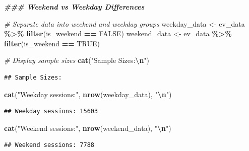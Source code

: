 \documentclass[
  12pt,
]{article}
\newenvironment{Shaded}{\begin{snugshade}}{\end{snugshade}}
\newcommand{\CommentTok}[1]{\textcolor[rgb]{0.56,0.35,0.01}{\textit{#1}}}
\newcommand{\ConstantTok}[1]{\textcolor[rgb]{0.56,0.35,0.01}{#1}}
\newcommand{\DocumentationTok}[1]{\textcolor[rgb]{0.56,0.35,0.01}{\textbf{\textit{#1}}}}
\newcommand{\FunctionTok}[1]{\textcolor[rgb]{0.13,0.29,0.53}{\textbf{#1}}}
\newcommand{\NormalTok}[1]{#1}
\newcommand{\OtherTok}[1]{\textcolor[rgb]{0.56,0.35,0.01}{#1}}
\newcommand{\SpecialCharTok}[1]{\textcolor[rgb]{0.81,0.36,0.00}{\textbf{#1}}}
\newcommand{\StringTok}[1]{\textcolor[rgb]{0.31,0.60,0.02}{#1}}
\begin{document}
\begin{Shaded}
\begin{Highlighting}[]
\DocumentationTok{\#\#\# Weekend vs Weekday Differences}

\CommentTok{\# Separate data into weekend and weekday groups}
\NormalTok{weekday\_data }\OtherTok{\textless{}{-}}\NormalTok{ ev\_data }\SpecialCharTok{\%\textgreater{}\%}
    \FunctionTok{filter}\NormalTok{(is\_weekend }\SpecialCharTok{==} \ConstantTok{FALSE}\NormalTok{)}
\NormalTok{weekend\_data }\OtherTok{\textless{}{-}}\NormalTok{ ev\_data }\SpecialCharTok{\%\textgreater{}\%}
    \FunctionTok{filter}\NormalTok{(is\_weekend }\SpecialCharTok{==} \ConstantTok{TRUE}\NormalTok{)}

\CommentTok{\# Display sample sizes}
\FunctionTok{cat}\NormalTok{(}\StringTok{"Sample Sizes:}\SpecialCharTok{\textbackslash{}n}\StringTok{"}\NormalTok{)}
\end{Highlighting}
\end{Shaded}

\begin{verbatim}
## Sample Sizes:
\end{verbatim}

\begin{Shaded}
\begin{Highlighting}[]
\FunctionTok{cat}\NormalTok{(}\StringTok{"Weekday sessions:"}\NormalTok{, }\FunctionTok{nrow}\NormalTok{(weekday\_data), }\StringTok{"}\SpecialCharTok{\textbackslash{}n}\StringTok{"}\NormalTok{)}
\end{Highlighting}
\end{Shaded}

\begin{verbatim}
## Weekday sessions: 15603
\end{verbatim}

\begin{Shaded}
\begin{Highlighting}[]
\FunctionTok{cat}\NormalTok{(}\StringTok{"Weekend sessions:"}\NormalTok{, }\FunctionTok{nrow}\NormalTok{(weekend\_data), }\StringTok{"}\SpecialCharTok{\textbackslash{}n}\StringTok{"}\NormalTok{)}
\end{Highlighting}
\end{Shaded}

\begin{verbatim}
## Weekend sessions: 7788
\end{verbatim}
\end{document}
